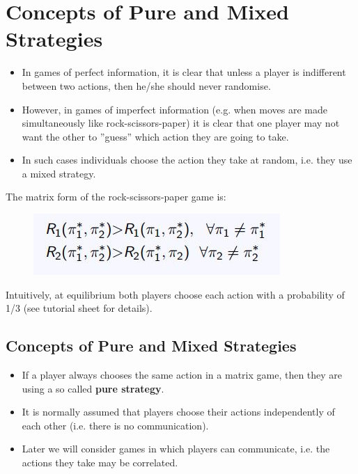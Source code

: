 \documentclass[]{report}
\begin{document}
\newpage
\section{Concepts of Pure and Mixed Strategies}
\begin{itemize}
\item In games of perfect information, it is clear that unless a player is
indifferent between two actions, then he/she should never
randomise.
\item However, in games of imperfect information (e.g. when moves are
made simultaneously like rock-scissors-paper) it is clear that one
player may not want the other to ”guess” which action they are
going to take.
\item In such cases individuals choose the action they take at random,
i.e. they use a mixed strategy.
\end{itemize}
The matrix form of the rock-scissors-paper game is:
\begin{figure}[h!]
\centering
\includegraphics[width=0.7\linewidth]{images/DR7-Slide41}
\caption{}
\label{fig:DR7-Slide41}
\end{figure}

Intuitively, at equilibrium both players choose each action with a
probability of 1/3 (see tutorial sheet for details).

\subsection{Concepts of Pure and Mixed Strategies}
\begin{itemize}
	\item If a player always chooses the same action in a matrix game, then
	they are using a so called \textbf{pure strategy}.
	\item It is normally assumed that players choose their actions
	independently of each other (i.e. there is no communication).
	\item Later we will consider games in which players can communicate,
	i.e. the actions they take may be correlated.
\end{itemize}
\end{document}
